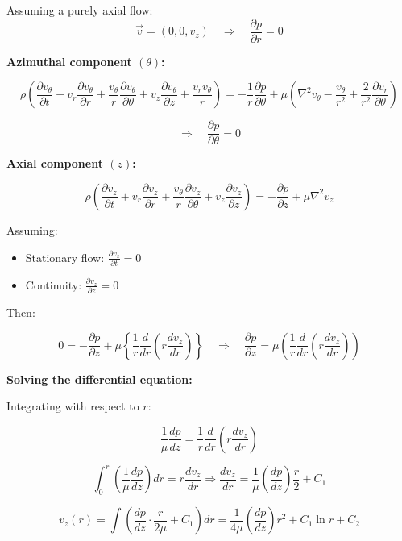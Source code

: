 \documentclass[a4paper,12pt]{article}
\begin{document}
\medskip

Assuming a purely axial flow:
\[
\vec{v} = (0, 0, v_z) \quad \Rightarrow \quad \frac{\partial p}{\partial r} = 0
\]

\bigskip

\textbf{Azimuthal component $(\theta)$:}

\[
\rho \left( \frac{\partial v_\theta}{\partial t} + v_r \frac{\partial v_\theta}{\partial r} + \frac{v_\theta}{r} \frac{\partial v_\theta}{\partial \theta} + v_z \frac{\partial v_\theta}{\partial z} + \frac{v_r v_\theta}{r} \right)
= -\frac{1}{r} \frac{\partial p}{\partial \theta}
+ \mu \left( \nabla^2 v_\theta - \frac{v_\theta}{r^2} + \frac{2}{r^2} \frac{\partial v_r}{\partial \theta} \right)
\]

\[
\Rightarrow \quad \frac{\partial p}{\partial \theta} = 0
\]

\bigskip

\textbf{Axial component $(z)$:}

\[
\rho \left( \frac{\partial v_z}{\partial t} + v_r \frac{\partial v_z}{\partial r} + \frac{v_\theta}{r} \frac{\partial v_z}{\partial \theta} + v_z \frac{\partial v_z}{\partial z} \right)
= -\frac{\partial p}{\partial z} + \mu \nabla^2 v_z
\]

Assuming:
\begin{itemize}
  \item Stationary flow: \( \frac{\partial v_z}{\partial t} = 0 \)
  \item Continuity: \( \frac{\partial v_z}{\partial z} = 0 \)
\end{itemize}

Then:

\[
0 = -\frac{\partial p}{\partial z} + \mu \left\{ \frac{1}{r} \frac{d}{dr} \left( r \frac{d v_z}{dr} \right) \right\}
\quad \Rightarrow \quad \frac{\partial p}{\partial z} = \mu \left( \frac{1}{r} \frac{d}{dr} \left( r \frac{d v_z}{dr} \right) \right)
\]

\textbf{Solving the differential equation:}

Integrating with respect to \( r \):

\[
\frac{1}{\mu} \frac{dp}{dz} = \frac{1}{r} \frac{d}{dr} \left( r \frac{d v_z}{dr} \right)
\]

\[
\int_0^r \left( \frac{1}{\mu} \frac{dp}{dz} \right) dr = r \frac{dv_z}{dr} \Rightarrow \frac{dv_z}{dr} = \frac{1}{\mu} \left( \frac{dp}{dz} \right) \frac{r}{2} + C_1
\]

\[
v_z(r) = \int \left( \frac{dp}{dz} \cdot \frac{r}{2\mu} + C_1 \right) dr
= \frac{1}{4\mu} \left( \frac{dp}{dz} \right) r^2 + C_1 \ln r + C_2
\]
\end{document}
